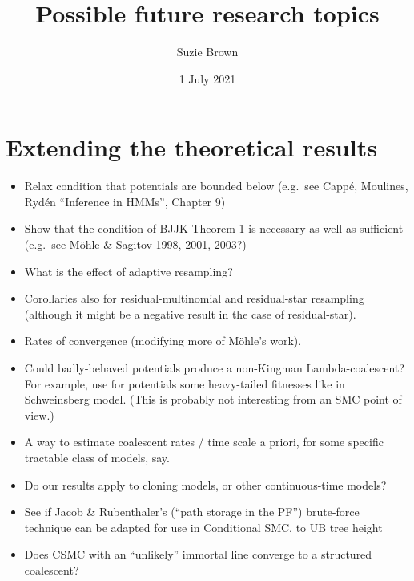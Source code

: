 \documentclass{article}
\title{Possible future research topics}
\author{Suzie Brown}
\date{1 July 2021}
\begin{document}
\maketitle
\thispagestyle{fancy}

\section*{Extending the theoretical results}
\begin{itemize}
\item Relax condition that potentials are bounded below (e.g.\ see Capp\'e, Moulines, Ryd\'en ``Inference in HMMs'', Chapter 9)
\item Show that the condition of BJJK Theorem 1 is necessary as well as sufficient (e.g.\ see M\"ohle \& Sagitov 1998, 2001, 2003?)
\item What is the effect of adaptive resampling?
\item Corollaries also for residual-multinomial and residual-star resampling (although it might be a negative result in the case of residual-star).
\item Rates of convergence (modifying more of M\"ohle's work).
\item Could badly-behaved potentials produce a non-Kingman Lambda-coalescent? For example, use for potentials some heavy-tailed fitnesses like in Schweinsberg model. (This is probably not interesting from an SMC point of view.)
\item A way to estimate coalescent rates / time scale a priori, for some specific tractable class of models, say.
\item Do our results apply to cloning models, or other continuous-time models?
\item See if Jacob \& Rubenthaler's (``path storage in the PF'') brute-force technique can be adapted for use in Conditional SMC, to UB tree height
\item Does CSMC with an ``unlikely'' immortal line converge to a structured coalescent?
\end{itemize}
\end{document}
